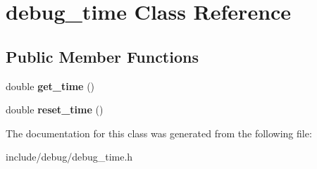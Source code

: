 \hypertarget{classdebug__time}{\section{debug\-\_\-time Class Reference}
\label{classdebug__time}
}
\subsection*{Public Member Functions}
\begin{DoxyCompactItemize}
\item 
\hypertarget{classdebug__time_af96faa8bb5ebfecdd85075983a7cafe6}{double {\bfseries get\-\_\-time} ()}\label{classdebug__time_af96faa8bb5ebfecdd85075983a7cafe6}

\item 
\hypertarget{classdebug__time_a0a06c34c59bad88a10886629b5fc2c75}{double {\bfseries reset\-\_\-time} ()}\label{classdebug__time_a0a06c34c59bad88a10886629b5fc2c75}

\end{DoxyCompactItemize}


The documentation for this class was generated from the following file\-:\begin{DoxyCompactItemize}
\item 
include/debug/debug\-\_\-time.\-h\end{DoxyCompactItemize}
